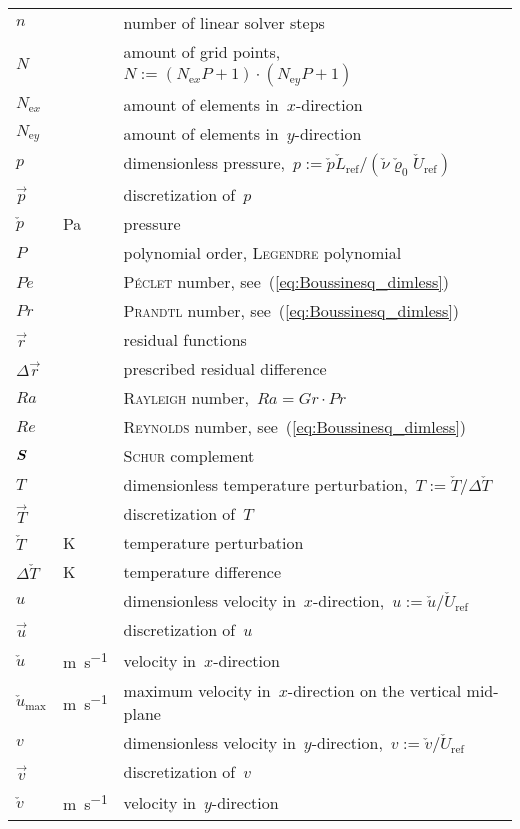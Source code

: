 \begin{longtable}{@{}p{} p{} p{}}
$n$ & ~ & number of linear solver steps\\
$N$ & ~ & amount of grid points,~$N := (N_{\mathrm{e}x}P+1)\cdot(N_{\mathrm{e}y}P+1)$\\
$N_{\mathrm{e}x}$ & ~ & amount of elements in~$x$-direction\\
$N_{\mathrm{e}y}$ & ~ & amount of elements in~$y$-direction\\
$p$ & ~ & dimensionless pressure,~$p := \check{p}\check{L}_\text{ref}/(\check{\nu}\check{\varrho}_0\check{U}_\text{ref})$\\
$\vec{p}$ & ~ & discretization of~$p$\\
$\check{p}$ & \si{Pa} & pressure\\
$P$ & ~ & polynomial order, \textsc{Legendre} polynomial\\
$P\acute{e}$ & ~ & \textsc{P\'{e}clet} number, see~(\ref{eq:Boussinesq_dimless})\\
$Pr$ & ~ & \textsc{Prandtl} number, see~(\ref{eq:Boussinesq_dimless})\\
$\vec{r}$ & ~ & residual functions\\
$\Delta\vec{r}$ & ~ & prescribed residual difference\\
$Ra$ & ~ & \textsc{Rayleigh} number,~$Ra = Gr \cdot Pr$\\
$Re$ & ~ & \textsc{Reynolds} number, see~(\ref{eq:Boussinesq_dimless})\\
$\boldsymbol{S}$ & ~ & \textsc{Schur} complement\\
$T$ & ~ & dimensionless temperature perturbation,~$T := \check{T}/\Delta\check{T}$\\
$\vec{T}$ & ~ & discretization of~$T$\\
$\check{T}$ & \si{\kelvin} & temperature perturbation\\
$\Delta\check{T}$ & \si{\kelvin} & temperature difference\\
$u$ & ~ & dimensionless velocity in~$x$-direction,~$u := \check{u}/\check{U}_\text{ref}$\\
$\vec{u}$ & ~ & discretization of~$u$\\
$\check{u}$ & \si{\m\per\s} & velocity in~$x$-direction\\
$\check{u}_\text{max}$ & \si{\m\per\s} & maximum velocity in~$x$-direction on the vertical mid-plane\\
$v$ & ~ & dimensionless velocity in~$y$-direction,~$v := \check{v}/\check{U}_\text{ref}$\\
$\vec{v}$ & ~ & discretization of~$v$\\
$\check{v}$ & \si{\m\per\s} & velocity in~$y$-direction\\

\end{longtable}

